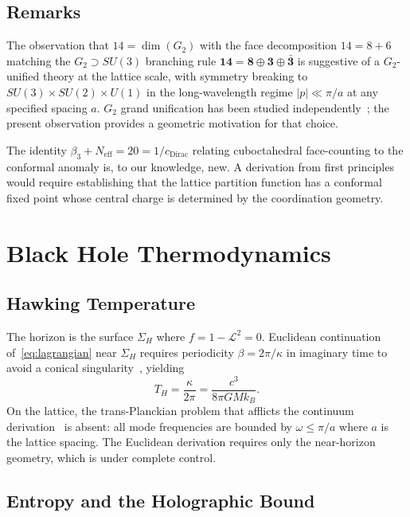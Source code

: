 \documentclass[12pt,a4paper]{article}
\begin{document}
\subsection{Remarks}

The observation that $14 = \dim(G_{2})$ with the face decomposition $14 = 8 + 6$ matching the $G_{2} \supset SU(3)$ branching rule $\mathbf{14} = \mathbf{8} \oplus \mathbf{3} \oplus \bar{\mathbf{3}}$ is suggestive of a $G_{2}$-unified theory at the lattice scale, with symmetry breaking to $SU(3) \times SU(2) \times U(1)$ in the long-wavelength regime $|p| \ll \pi/a$ at any specified spacing $a$. $G_{2}$ grand unification has been studied independently~\cite{GurseyRamond}; the present observation provides a geometric motivation for that choice.

The identity $\beta_{3} + N_{\mathrm{eff}} = 20 = 1/c_{\mathrm{Dirac}}$ relating cuboctahedral face-counting to the conformal anomaly is, to our knowledge, new. A derivation from first principles would require establishing that the lattice partition function has a conformal fixed point whose central charge is determined by the coordination geometry.

\section{Black Hole Thermodynamics}

\subsection{Hawking Temperature}

The horizon is the surface $\Sigma_{H}$ where $f = 1 - \mathcal{L}^{2} = 0$. Euclidean continuation of~\eqref{eq:lagrangian} near $\Sigma_{H}$ requires periodicity $\beta = 2\pi/\kappa$ in imaginary time to avoid a conical singularity~\cite{GibbonsHawking}, yielding
\begin{equation}\label{eq:hawking}
T_{H} = \frac{\kappa}{2\pi} = \frac{c^{3}}{8\pi G M k_{B}}.
\end{equation}
On the lattice, the trans-Planckian problem that afflicts the continuum derivation~\cite{Jacobson} is absent: all mode frequencies are bounded by $\omega \leq \pi/a$ where $a$ is the lattice spacing. The Euclidean derivation requires only the near-horizon geometry, which is under complete control.

\subsection{Entropy and the Holographic Bound}
\end{document}
